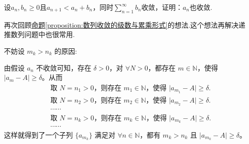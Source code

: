 \documentclass[../../main.tex]{subfiles}
\begin{document}
\begin{example}
设\(a_n,b_n\geqslant 0\)且\(a_{n + 1}<a_n + b_n\)，同时\(\sum_{n = 1}^{\infty}b_n\)收敛，证明：\(a_n\)也收敛.
\end{example}
\begin{note}
再次回顾\hyperref[proposition:数列收敛的级数与累乘形式]{命题\ref{proposition:数列收敛的级数与累乘形式}}的想法.这个想法再解决递推数列问题中也很常用.
\end{note}
\begin{remark}
\hypertarget{example4.58不妨设的原因}{不妨设 \(m_k > n_k\) 的原因:}由假设 \(a_n\) 不收敛可知，存在 \(\delta > 0\)，对 \(\forall N > 0\)，都存在 \(m \in \mathbb{N}\)，使得 \(\vert a_m - A \vert \geqslant \delta\)。从而
\begin{align*}
&\text{取 }N = n_1 > 0\text{，则存在 }m_1 \in \mathbb{N}\text{，使得 }\vert a_{m_1} - A \vert \geqslant \delta.\\
&\text{取 }N = n_2 > 0\text{，则存在 }m_2 \in \mathbb{N}\text{，使得 }\vert a_{m_2} - A \vert \geqslant \delta.\\
&\cdots\cdots\\
&\text{取 }N = n_k > 0\text{，则存在 }m_k \in \mathbb{N}\text{，使得 }\vert a_{m_k} - A \vert \geqslant \delta.\\
&\cdots\cdots
\end{align*}
这样就得到了一个子列 \(\{ a_{m_k} \}\) 满足对 \(\forall n \in \mathbb{N}\)，都有 \(m_k > n_k\) 且 \(\vert a_{m_k} - A \vert \geqslant \delta\)。
\end{remark}
\end{document}
